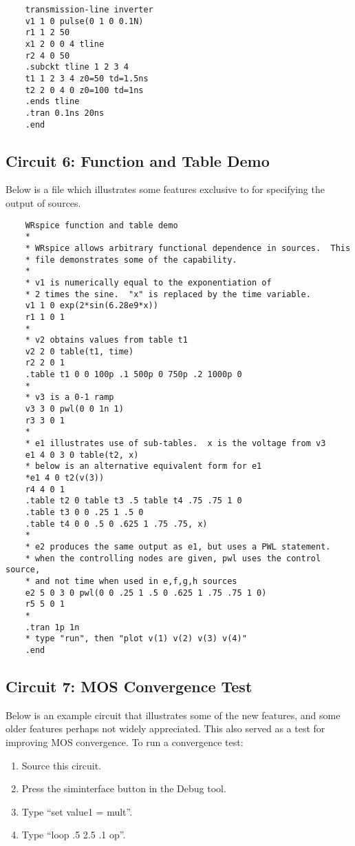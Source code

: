 \begin{verbatim}
    transmission-line inverter
    v1 1 0 pulse(0 1 0 0.1N)
    r1 1 2 50
    x1 2 0 0 4 tline
    r2 4 0 50
    .subckt tline 1 2 3 4
    t1 1 2 3 4 z0=50 td=1.5ns
    t2 2 0 4 0 z0=100 td=1ns
    .ends tline
    .tran 0.1ns 20ns
    .end
\end{verbatim}

\subsection{Circuit 6:  Function and Table Demo}


Below is a file which illustrates some features exclusive to {\WRspice} 
for specifying the output of sources.

\begin{verbatim}
    WRspice function and table demo
    *
    * WRspice allows arbitrary functional dependence in sources.  This
    * file demonstrates some of the capability.
    *
    * v1 is numerically equal to the exponentiation of
    * 2 times the sine.  "x" is replaced by the time variable.
    v1 1 0 exp(2*sin(6.28e9*x))
    r1 1 0 1
    *
    * v2 obtains values from table t1
    v2 2 0 table(t1, time)
    r2 2 0 1
    .table t1 0 0 100p .1 500p 0 750p .2 1000p 0
    *
    * v3 is a 0-1 ramp
    v3 3 0 pwl(0 0 1n 1)
    r3 3 0 1
    *
    * e1 illustrates use of sub-tables.  x is the voltage from v3
    e1 4 0 3 0 table(t2, x)
    * below is an alternative equivalent form for e1
    *e1 4 0 t2(v(3))
    r4 4 0 1
    .table t2 0 table t3 .5 table t4 .75 .75 1 0
    .table t3 0 0 .25 1 .5 0
    .table t4 0 0 .5 0 .625 1 .75 .75, x)
    *
    * e2 produces the same output as e1, but uses a PWL statement.
    * when the controlling nodes are given, pwl uses the control source,
    * and not time when used in e,f,g,h sources
    e2 5 0 3 0 pwl(0 0 .25 1 .5 0 .625 1 .75 .75 1 0)
    r5 5 0 1
    *
    .tran 1p 1n
    * type "run", then "plot v(1) v(2) v(3) v(4)"
    .end
\end{verbatim}

\subsection{Circuit 7:  MOS Convergence Test}


Below is an example circuit that illustrates some of the new features,
and some older features perhaps not widely appreciated.  This also
served as a test for improving MOS convergence.  To run a convergence
test:
\begin{enumerate}
\item{Source this circuit.}
\item{Press the {\cb siminterface} button in the Debug tool.}
\item{Type ``{\vt set value1 = mult}''.}
\item{Type ``{\vt loop .5 2.5 .1 op}''.}
\end{enumerate}

